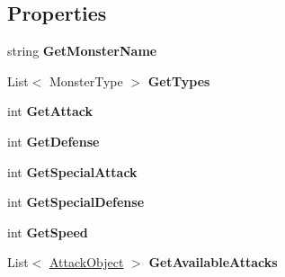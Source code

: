 \subsection*{Properties}
\begin{DoxyCompactItemize}
\item 
\hypertarget{class_monster_data_object_a6c67d5bab62fb649e01355b52ccf16ba}{string {\bfseries Get\-Monster\-Name}}\label{class_monster_data_object_a6c67d5bab62fb649e01355b52ccf16ba}

\item 
\hypertarget{class_monster_data_object_a0d1ed24b79b82bb78c26811aa34b3ac7}{List$<$ Monster\-Type $>$ {\bfseries Get\-Types}}\label{class_monster_data_object_a0d1ed24b79b82bb78c26811aa34b3ac7}

\item 
\hypertarget{class_monster_data_object_ae1c3d104809049c612c9a1b6a61664be}{int {\bfseries Get\-Attack}}\label{class_monster_data_object_ae1c3d104809049c612c9a1b6a61664be}

\item 
\hypertarget{class_monster_data_object_a2409f379ef651b10b5d7638154da7421}{int {\bfseries Get\-Defense}}\label{class_monster_data_object_a2409f379ef651b10b5d7638154da7421}

\item 
\hypertarget{class_monster_data_object_a5beec2bbced5d78744aa0ea784218357}{int {\bfseries Get\-Special\-Attack}}\label{class_monster_data_object_a5beec2bbced5d78744aa0ea784218357}

\item 
\hypertarget{class_monster_data_object_aafcc2ea03b96291140ebcb40331e4cd2}{int {\bfseries Get\-Special\-Defense}}\label{class_monster_data_object_aafcc2ea03b96291140ebcb40331e4cd2}

\item 
\hypertarget{class_monster_data_object_a0d7639dc92ae01942b1b996565eff2ae}{int {\bfseries Get\-Speed}}\label{class_monster_data_object_a0d7639dc92ae01942b1b996565eff2ae}

\item 
\hypertarget{class_monster_data_object_aced78f5f04d3dbb79a0f8291fbe118bd}{List$<$ \hyperlink{class_attack_object}{Attack\-Object} $>$ {\bfseries Get\-Available\-Attacks}}\label{class_monster_data_object_aced78f5f04d3dbb79a0f8291fbe118bd}

\end{DoxyCompactItemize}



